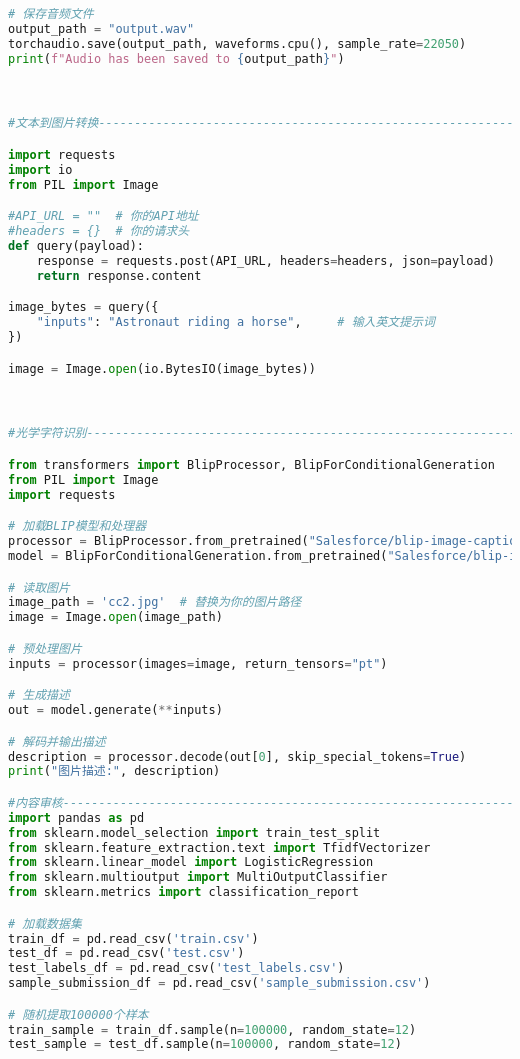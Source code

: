 \documentclass{article}
\begin{document}
\begin{lstlisting}[language=Python]
# 保存音频文件
output_path = "output.wav"
torchaudio.save(output_path, waveforms.cpu(), sample_rate=22050)
print(f"Audio has been saved to {output_path}")



#文本到图片转换-----------------------------------------------------------------

import requests
import io
from PIL import Image

#API_URL = ""  # 你的API地址
#headers = {}  # 你的请求头
def query(payload):
    response = requests.post(API_URL, headers=headers, json=payload)
    return response.content

image_bytes = query({
    "inputs": "Astronaut riding a horse",     # 输入英文提示词
})

image = Image.open(io.BytesIO(image_bytes))



#光学字符识别-------------------------------------------------------------------------------------

from transformers import BlipProcessor, BlipForConditionalGeneration
from PIL import Image
import requests

# 加载BLIP模型和处理器
processor = BlipProcessor.from_pretrained("Salesforce/blip-image-captioning-base")
model = BlipForConditionalGeneration.from_pretrained("Salesforce/blip-image-captioning-base")

# 读取图片
image_path = 'cc2.jpg'  # 替换为你的图片路径
image = Image.open(image_path)

# 预处理图片
inputs = processor(images=image, return_tensors="pt")

# 生成描述
out = model.generate(**inputs)

# 解码并输出描述
description = processor.decode(out[0], skip_special_tokens=True)
print("图片描述:", description)

#内容审核-----------------------------------------------------------------------------
import pandas as pd
from sklearn.model_selection import train_test_split
from sklearn.feature_extraction.text import TfidfVectorizer
from sklearn.linear_model import LogisticRegression
from sklearn.multioutput import MultiOutputClassifier
from sklearn.metrics import classification_report

# 加载数据集
train_df = pd.read_csv('train.csv')
test_df = pd.read_csv('test.csv')
test_labels_df = pd.read_csv('test_labels.csv')
sample_submission_df = pd.read_csv('sample_submission.csv')

# 随机提取100000个样本
train_sample = train_df.sample(n=100000, random_state=12)
test_sample = test_df.sample(n=100000, random_state=12)


\end{lstlisting}
\end{document}
